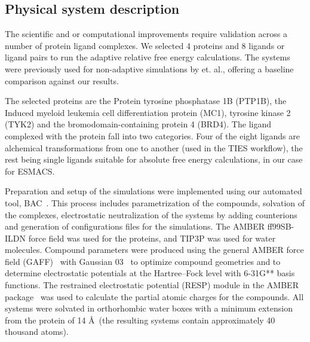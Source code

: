 \subsection{Physical system description}

The scientific and or computational improvements require validation across a number of protein ligand complexes. We selected 4 proteins and 8 ligands or ligand pairs to run the adaptive relative free energy calculations. The systems were previously used for non-adaptive simulations by \cite{} et. al., offering a baseline comparison against our results. 

The selected proteins are the Protein tyrosine phosphatase 1B (PTP1B), the Induced myeloid leukemia cell differentiation protein (MC1), tyrosine kinase 2 (TYK2) and the bromodomain-containing protein 4 (BRD4). The ligand complexed with the protein fall into two categories. Four of the eight ligands are alchemical transformations from one to another (used in the TIES workflow), the rest being single ligands suitable for absolute free energy calculations, in our case for ESMACS.

Preparation and setup of the simulations were implemented using our automated tool, BAC~\cite{Sadiq2008}. This process includes parametrization of the compounds, solvation of the complexes, electrostatic neutralization of the systems by adding counterions and generation of configurations files for the simulations. The AMBER ff99SB-ILDN \cite{Lindorff-Larsen2010} force field was used for the proteins, and TIP3P was used for water molecules. Compound parameters were produced using the general AMBER force field (GAFF)~\cite{Wang2004} with Gaussian 03~\cite{Frisch} to optimize compound geometries and to determine electrostatic potentials at the Hartree–Fock level with 6-31G** basis functions. The restrained electrostatic potential (RESP) module in the AMBER package~\cite{Case2005} was used to calculate the partial atomic charges for the compounds. All systems were solvated in orthorhombic water boxes with a minimum extension from the protein of 14 \AA\ (the resulting systems contain approximately 40 thousand atoms).

